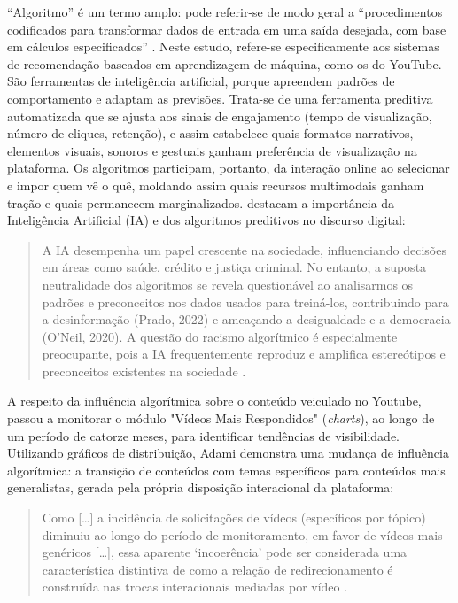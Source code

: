 \documentclass[portuguese]{textolivre}
\begin{document}
“Algoritmo” é um termo amplo: pode referir-se de modo geral a “procedimentos codificados para transformar dados de entrada em uma saída desejada, com base em cálculos especificados” \cite[p. 1]{Gillespie2018CustodiansInternet}. Neste estudo, refere-se especificamente aos sistemas de recomendação baseados em aprendizagem de máquina, como os do YouTube. São ferramentas de inteligência artificial, porque apreendem padrões de comportamento e adaptam as previsões. Trata-se de uma ferramenta preditiva automatizada que se ajusta aos sinais de engajamento (tempo de visualização, número de cliques, retenção), e assim estabelece quais formatos narrativos, elementos visuais, sonoros e gestuais ganham preferência de visualização na plataforma. Os algoritmos participam, portanto, da interação online ao selecionar e impor quem vê o quê, moldando assim quais recursos multimodais ganham tração e quais permanecem marginalizados. \textcite{AraujoAraujo2024RacismoAlgoritmico} destacam a importância da Inteligência Artificial (IA) e dos algoritmos preditivos no discurso digital:

\begin{quote}
    A IA desempenha um papel crescente na sociedade, influenciando decisões em áreas como saúde, crédito e justiça criminal. No entanto, a suposta neutralidade dos algoritmos se revela questionável ao analisarmos os padrões e preconceitos nos dados usados para treiná-los, contribuindo para a desinformação (Prado, 2022) e ameaçando a desigualdade e a democracia (O’Neil, 2020). A questão do racismo algorítmico é especialmente preocupante, pois a IA frequentemente reproduz e amplifica estereótipos e preconceitos existentes na sociedade \cite[p. 90]{AraujoAraujo2024RacismoAlgoritmico}.
\end{quote}

A respeito da influência algorítmica sobre o conteúdo veiculado no Youtube, \textcite{Adami2009VideoInteraction} passou a monitorar o módulo "Vídeos Mais Respondidos" (\textit{charts}), ao longo de um período de catorze meses, para identificar tendências de visibilidade. Utilizando gráficos de distribuição, Adami demonstra uma mudança de influência algorítmica: a transição de conteúdos com temas específicos para conteúdos mais generalistas, gerada pela própria disposição interacional da plataforma:

\begin{quote}
    Como […] a incidência de solicitações de vídeos (específicos por tópico) diminuiu ao longo do período de monitoramento, em favor de vídeos mais genéricos […], essa aparente ‘incoerência’ pode ser considerada uma característica distintiva de como a relação de redirecionamento é construída nas trocas interacionais mediadas por vídeo \cite[p. 105, tradução própria]{Adami2009VideoInteraction}.
\end{quote}
\end{document}
